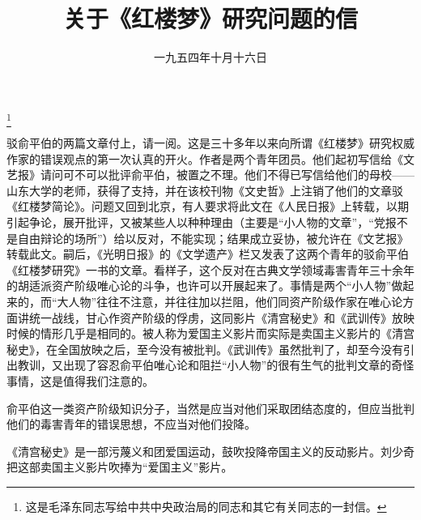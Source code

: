 
\title{关于《红楼梦》研究问题的信}
\date{一九五四年十月十六日}
\thanks{这是毛泽东同志写给中共中央政治局的同志和其它有关同志的一封信。}
\maketitle


驳俞平伯的两篇文章付上，请一阅。这是三十多年以来向所谓《红楼梦》研究权威作家的错误观点的第一次认真的开火。作者是两个青年团员。他们起初写信给《文艺报》请问可不可以批评俞平伯，被置之不理。他们不得已写信给他们的母校——山东大学的老师，获得了支持，并在该校刊物《文史哲》上注销了他们的文章驳《红楼梦简论》。问题又回到北京，有人要求将此文在《人民日报》上转载，以期引起争论，展开批评，又被某些人以种种理由（主要是“小人物的文章”，“党报不是自由辩论的场所”）给以反对，不能实现；结果成立妥协，被允许在《文艺报》转载此文。嗣后，《光明日报》的《文学遗产》栏又发表了这两个青年的驳俞平伯《红楼梦研究》一书的文章。看样子，这个反对在古典文学领域毒害青年三十余年的胡适派资产阶级唯心论的斗争，也许可以开展起来了。事情是两个“小人物”做起来的，而“大人物”往往不注意，并往往加以拦阻，他们同资产阶级作家在唯心论方面讲统一战线，甘心作资产阶级的俘虏，这同影片《清宫秘史》和《武训传》放映时候的情形几乎是相同的。被人称为爱国主义影片而实际是卖国主义影片的《清宫秘史》，在全国放映之后，至今没有被批判。《武训传》虽然批判了，却至今没有引出教训，又出现了容忍俞平伯唯心论和阻拦“小人物”的很有生气的批判文章的奇怪事情，这是值得我们注意的。

俞平伯这一类资产阶级知识分子，当然是应当对他们采取团结态度的，但应当批判他们的毒害青年的错误思想，不应当对他们投降。


\begin{maonote}
《清宫秘史》是一部污蔑义和团爱国运动，鼓吹投降帝国主义的反动影片。刘少奇把这部卖国主义影片吹捧为“爱国主义”影片。
\end{maonote}
